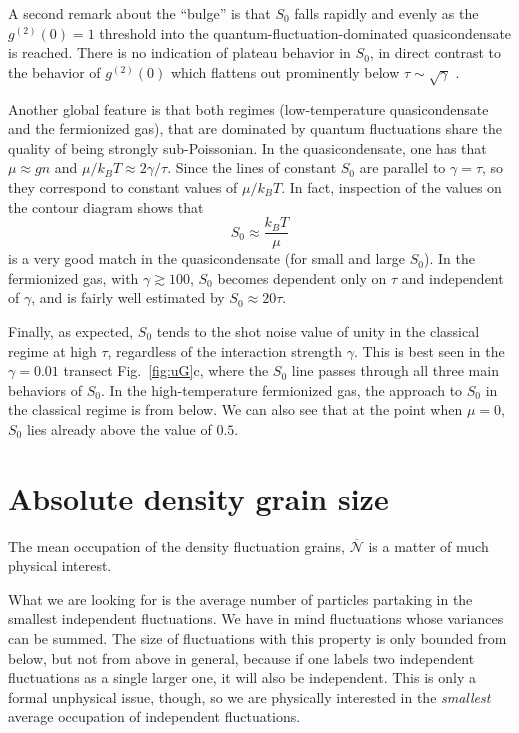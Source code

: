 \documentclass[aps,twocolumn,pra,superscriptaddress,nofootinbib,amsmath,amssymb,floats,floatfix,english]{revtex4-1}
\newcommand{\mc}[1]{{\mathcal{#1}}}
\newcommand{\wb}[1]{{\overline{#1}}}
\renewcommand{\eq}[2]{\begin{equation}\label{#1}#2\end{equation}}
\begin{document}
A second remark about the ``bulge'' is that $S_0$ falls rapidly and evenly as the $g^{(2)}(0)=1$ threshold into the quantum-fluctuation-dominated quasicondensate is reached. There is no indication of plateau behavior in $S_0$, in direct contrast to the behavior of $g^{(2)}(0)$ which flattens out prominently  below $\tau\sim\sqrt{\gamma}$ \cite{Kheruntsyan03}. 

Another global feature is that both regimes 
(low-temperature quasicondensate and the fermionized gas), that are dominated by quantum fluctuations 
share the quality of being strongly sub-Poissonian. 
In the quasicondensate, one has that $\mu\approx gn$ and  $\mu/k_BT \approx 2\gamma/\tau$. 
Since  the lines of constant $S_0$ are parallel to $\gamma=\tau$, so they correspond to constant values of $\mu/k_BT$. 
In fact, inspection of the values on the contour diagram shows that 
\eq{S0q}{
S_0\approx\frac{k_BT}{\mu}
} 
is a very good match in the quasicondensate (for small and large $S_0$).
In the fermionized gas, with $\gamma\gtrsim100$, $S_0$ becomes dependent only on $\tau$ and independent of $\gamma$, and is fairly well estimated by $S_0\approx 20\tau$.

Finally, as expected, $S_0$ tends to the shot noise value of unity in the classical regime at high $\tau$, regardless of the interaction strength $\gamma$. This is best seen in the $\gamma=0.01$ transect Fig.~\ref{fig:uG}c, where the $S_0$ line passes through all three main behaviors of $S_0$.
In the high-temperature fermionized gas, the approach to $S_0$ in the classical regime is from below. We can also see that at the point when $\mu=0$, $S_0$ lies already above the value of $0.5.$ 


\section{Absolute density grain size}
\label{GRAINS}

The mean occupation of the density fluctuation grains, $\wb{\mc{N}}$ is a matter of much physical interest. 

What we are looking for is the average number of particles partaking in the smallest independent fluctuations.
We have in mind fluctuations whose variances can be summed.  
The size of fluctuations with this property is only bounded from below, but not from above 
in general, because if one labels two independent fluctuations as a single larger one, it will also be independent. 
This is only a formal unphysical issue, though, so we are physically interested in the \emph{smallest} average occupation of independent fluctuations. 
\end{document}
